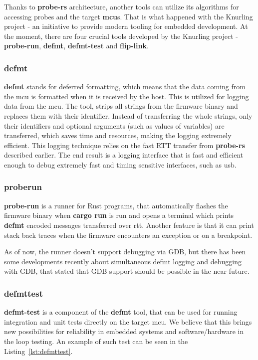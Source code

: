Thanks to \textbf{probe-rs} architecture, another tools can utilize its algorithms for accessing probes and the target \textbf{mcu}s.
That is what happened with the Knurling project - an initiative to provide modern tooling for embedded development.
At the moment, there are four crucial tools developed by the Knurling project - \textbf{probe-run}, \textbf{defmt}, \textbf{defmt-test} and \textbf{flip-link}.

\subsubsection{defmt}
\textbf{defmt} stands for deferred formatting\cite{knurling_project_knurling-rsdefmt_2021}, which means that the data coming from the \acs{mcu} is formatted when it is received by the host.
This is utilized for logging data from the \acs{mcu}.
The tool, strips all strings from the firmware binary and replaces them with their identifier.
Instead of transferring the whole strings, only their identifiers and optional arguments (such as values of variables) are transferred, which saves time and resources, making the logging extremely efficient.
This logging technique relies on the fast RTT transfer from \textbf{probe-rs} described earlier.
The end result is a logging interface that is fast and efficient enough to debug extremely fast and timing sensitive interfaces, such as \acs{usb}.

\subsubsection{probe\textendash run}
\textbf{probe-run} is a runner for Rust programs\cite{knurling_project_knurling-rsprobe-run_2021}, that automatically flashes the firmware binary when \textbf{cargo run} is run and opens a terminal which prints \textbf{defmt} encoded messages transferred over \acs{rtt}.
Another feature is that it can print stack back traces when the firmware encounters an exception or on a breakpoint.

As of now, the runner doesn't support debugging via GDB, but there has been some developments recently about simultaneous defmt logging and debugging with GDB, that stated that GDB support should be possible in the near future\cite{aparicio_using_nodate}.

\subsubsection{defmt\textendash test}
\label{subsubsec:defmttest}
\textbf{defmt-test} is a component of the \textbf{defmt} tool, that can be used for running integration and unit tests directly on the target \acs{mcu}.
We believe that this brings new possibilities for reliability in embedded systems and software/hardware in the loop testing.
An example of such test can be seen in the Listing~\ref{lst:defmttest}\cite{knurling_project_knurling-rsdefmt_2021}.

